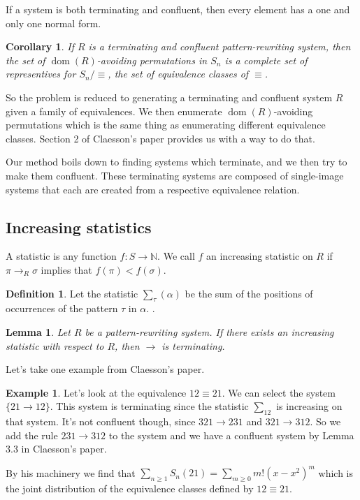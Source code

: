 \documentclass[a4paper, 11pt]{article}
\newtheorem{lemma}[theorem]{Lemma}
\newtheorem{corollary}[theorem]{Corollary}
\theoremstyle{definition}
\newtheorem{definition}[theorem]{Definition}
\newtheorem{example}[theorem]{Example}
\newcommand{\Sym}{S}
\DeclareMathOperator{\dom}{dom}
\begin{document}
If a system is both terminating and confluent, then every element has a one and
only one normal form.

\begin{corollary}
    If $R$ is a terminating and confluent pattern-rewriting system, then the set
    of $\dom(R)$-avoiding permutations in $S_n$ is a complete set of
    representives for $S_n / \equiv$, the set of equivalence classes of
    $\equiv$.
\end{corollary}

So the problem is reduced to generating a terminating and confluent system $R$
given a family of equivalences. We then enumerate $\dom(R)$-avoiding
permutations which is the same thing as enumerating different equivalence
classes.  Section 2 of Claesson's paper provides us with a way to do that.
\cite{claesson:2021}

Our method boils down to finding systems which terminate, and we then try to
make them confluent.  These terminating systems are composed of single-image
systems that each are created from a respective equivalence relation.

\subsection{Increasing statistics}
A statistic is any function $f : \Sym \to \mathbb{N}$. We call $f$ an increasing
statistic on $R$ if $\pi \to_R \sigma$ implies that $f(\pi) < f(\sigma)$.

\begin{definition}
    Let the statistic $\sum_\tau(\alpha)$ be the sum of the positions of occurrences of
    the pattern $\tau$ in $\alpha$. 
    \cite{claesson:2021}.
\end{definition}

\begin{lemma}
    Let $R$ be a pattern-rewriting system. If there exists an increasing
    statistic with respect to $R$, then $\to$ is terminating.    
\end{lemma}

Let's take one example from Claesson's paper.
\begin{example}
    Let's look at the equivalence $12 \equiv 21$. We can select the system 
    $\{ 21 \to 12 \}$. This system is terminating since the statistic $\sum_{12}$ is
    increasing on that system. It's not confluent though, since $321 \to 231$
    and $321 \to 312$. So we add the rule $231 \to 312$ to the system and we
    have a confluent system by Lemma 3.3 in Claesson's paper. 

    By his machinery we find that $\sum_{n \geq 1} \Sym_n(21) = \sum_{m \geq 0}
    m!(x-x^2)^m$ which is the joint distribution of the equivalence classes
    defined by $12 \equiv 21$.
\end{example}
\end{document}

